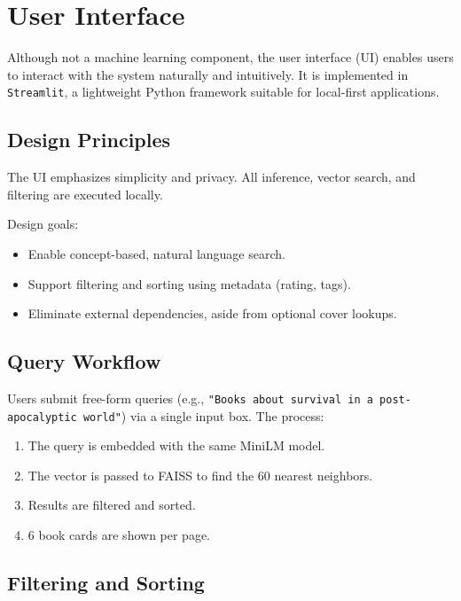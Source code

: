\chapter{User Interface}
\label{chapter:interface}

Although not a machine learning component, the user interface (UI) enables users to interact with the system naturally and intuitively. It is implemented in \texttt{Streamlit}, a lightweight Python framework suitable for local-first applications.

\section{Design Principles}
\label{sec:ui-design}

The UI emphasizes simplicity and privacy. All inference, vector search, and filtering are executed locally.

Design goals:

\begin{itemize}
    \item Enable concept-based, natural language search.
    \item Support filtering and sorting using metadata (rating, tags).
    \item Eliminate external dependencies, aside from optional cover lookups.
\end{itemize}

\section{Query Workflow}
\label{sec:ui-query-workflow}

Users submit free-form queries (e.g., \texttt{"Books about survival in a post-apocalyptic world"}) via a single input box.
The process:

\begin{enumerate}
    \item The query is embedded with the same MiniLM model.
    \item The vector is passed to FAISS to find the 60 nearest neighbors.
    \item Results are filtered and sorted.
    \item 6 book cards are shown per page.
\end{enumerate}

\section{Filtering and Sorting}
\label{sec:ui-filtering}

